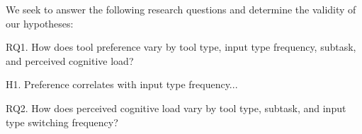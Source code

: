 \documentclass[11pt, oneside]{article}   	%
\begin{document}



We seek to answer the following research questions and determine the validity of our hypotheses:


RQ1. How does tool preference vary by tool type, input type frequency, subtask, and perceived cognitive load?

H1. Preference correlates with input type frequency...

RQ2. How does perceived cognitive load vary by tool type, subtask, and input type switching frequency?
\end{document}
